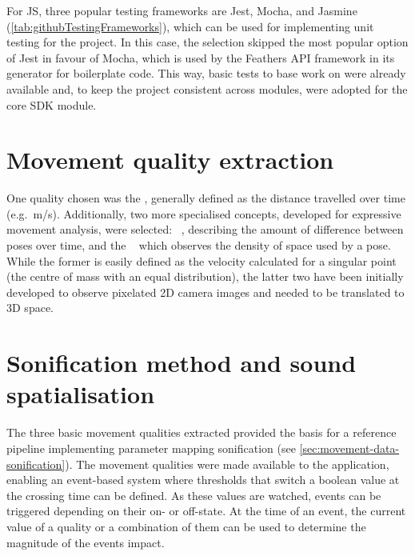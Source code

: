 For \ac{JS}, three popular testing frameworks are Jest, Mocha, and Jasmine (\ref{tab:githubTestingFrameworks}), which can be used for implementing unit testing for the project.
In this case, the selection skipped the most popular option of Jest in favour of Mocha, which is used by the Feathers \ac{API} framework in its generator for boilerplate code.
This way, basic tests to base work on were already available and, to keep the project consistent across modules, were adopted for the core \ac{SDK} module.



\section{Movement quality extraction}
\label{sec:movement-quality-extraction}

One quality chosen was the , generally defined as the distance travelled over time (e.g.\ m/s).
Additionally, two more specialised concepts, developed for expressive movement analysis, were selected: ~\parencite[96-97]{movementQualities}, describing the amount of difference between poses over time, and the ~\parencite[97]{movementQualities} which observes the density of space used by a pose.
While the former is easily defined as the velocity calculated for a singular point (the centre of mass with an equal distribution), the latter two have been initially developed to observe pixelated \ac{2D} camera images and needed to be translated to \ac{3D} space.

\section{Sonification method and sound spatialisation}
\label{sec:sonification-method-and-sound-spatialisation}

The three basic movement qualities extracted provided the basis for a reference pipeline implementing parameter mapping sonification (see \autoref{sec:movement-data-sonification}).
The movement qualities were made available to the application, enabling an event-based system where thresholds that switch a boolean value at the crossing time can be defined.
As these values are watched, events can be triggered depending on their on- or off-state.
At the time of an event, the current value of a quality or a combination of them can be used to determine the magnitude of the event\textquotesingle s impact.

